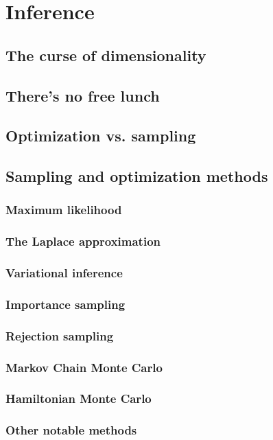 \documentclass[]{report}
\begin{document}
\section{Inference}
\subsection{The curse of dimensionality}
\subsection{There's no free lunch}
\subsection{Optimization vs. sampling}

\subsection{Sampling and optimization methods}
\subsubsection{Maximum likelihood}
\subsubsection{The Laplace approximation}
\subsubsection{Variational inference}
\subsubsection{Importance sampling}
\subsubsection{Rejection sampling}
\subsubsection{Markov Chain Monte Carlo}
\subsubsection{Hamiltonian Monte Carlo}
\subsubsection{Other notable methods}
\end{document}
